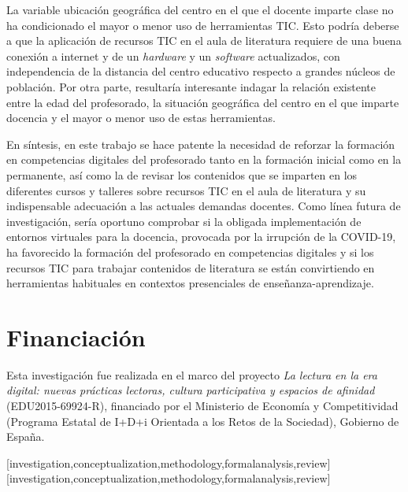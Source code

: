 \documentclass[spanish]{textolivre}
\begin{document}
La variable ubicación geográfica del centro en el que el docente imparte clase no ha condicionado el mayor o menor uso de herramientas TIC. Esto podría deberse a que la aplicación de recursos TIC en el aula de literatura requiere de una buena conexión a internet y de un \textit{hardware} y un \textit{software} actualizados, con independencia de la distancia del centro educativo respecto a grandes núcleos de población. Por otra parte, resultaría interesante indagar la relación existente entre la edad del profesorado, la situación geográfica del centro en el que imparte docencia y el mayor o menor uso de estas herramientas.

En síntesis, en este trabajo se hace patente la necesidad de reforzar la formación en competencias digitales del profesorado tanto en la formación inicial como en la permanente, así como la de revisar los contenidos que se imparten en los diferentes cursos y talleres sobre recursos TIC en el aula de literatura y su indispensable adecuación a las actuales demandas docentes. Como línea futura de investigación, sería oportuno comprobar si la obligada implementación de entornos virtuales para la docencia, provocada por la irrupción de la COVID-19, ha favorecido la formación del profesorado en competencias digitales y si los recursos TIC para trabajar contenidos de literatura se están convirtiendo en herramientas habituales en contextos presenciales de enseñanza-aprendizaje.

\section{Financiación}\label{sec-secoes}
Esta investigación fue realizada en el marco del proyecto \emph{La lectura en la era digital: nuevas prácticas lectoras, cultura participativa y espacios de afinidad} (EDU2015-69924-R), financiado por el Ministerio de Economía y Competitividad (Programa Estatal de I+D+i Orientada a los Retos de la Sociedad), Gobierno de España.

\printbibliography\label{sec-bib}

\begin{contributors}
[investigation,conceptualization,methodology,formalanalysis,review]
[investigation,conceptualization,methodology,formalanalysis,review]
\end{contributors}
\end{document}
